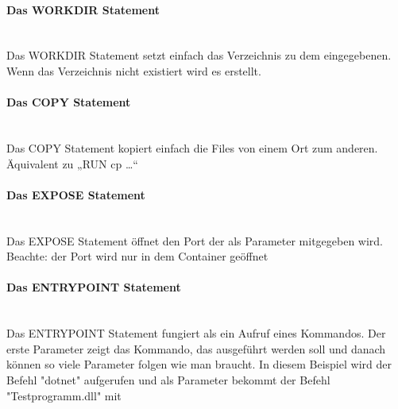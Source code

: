 \paragraph{Das WORKDIR Statement}\mbox{}\\
Das WORKDIR Statement setzt einfach das Verzeichnis zu dem eingegebenen. Wenn das Verzeichnis nicht existiert wird es erstellt.
\paragraph{Das COPY Statement}\mbox{}\\
Das COPY Statement kopiert einfach die Files von einem Ort zum anderen. Äquivalent zu „RUN cp …“
\paragraph{Das EXPOSE Statement}\mbox{}\\
Das EXPOSE Statement öffnet den Port der als Parameter mitgegeben wird. Beachte: der Port wird nur in dem Container geöffnet
\paragraph{Das ENTRYPOINT Statement}\mbox{}\\
Das ENTRYPOINT Statement fungiert als ein Aufruf eines Kommandos. Der erste Parameter zeigt das Kommando, das ausgeführt werden soll und danach können so viele Parameter folgen wie man braucht. In diesem Beispiel wird der Befehl "dotnet" aufgerufen und als Parameter bekommt der Befehl "Testprogramm.dll" mit
